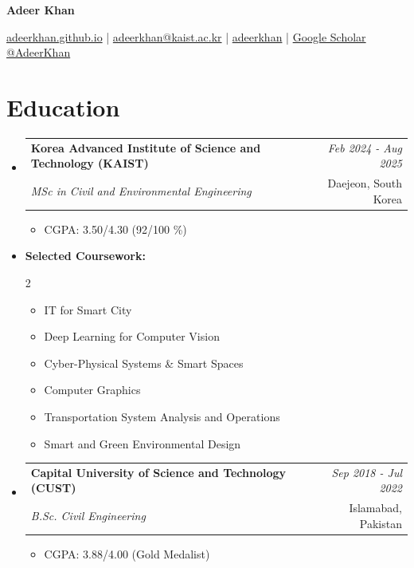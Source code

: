 \documentclass[a4paper,11pt]{article}
\makeatletter
\newcommand{\resumeSubheading}[4]{
\vspace{0.5mm}\item
    \begin{tabular*}{0.98\textwidth}[t]{l@{\extracolsep{\fill}}r}
        \textbf{#1} & \textit{\footnotesize{#4}} \\
        \textit{\footnotesize{#3}} &  \footnotesize{#2}\\
    \end{tabular*}
    \vspace{-2.4mm}
}
\newcommand{\resumeSubHeadingListStart}{\begin{itemize}[leftmargin=*,labelsep=1mm]}
\newcommand{\resumeItemListStart}{\begin{itemize}[leftmargin=*,labelsep=1mm,itemsep=0.5mm]}
\newcommand{\resumeSubHeadingListEnd}{\end{itemize}\vspace{2mm}}
\newcommand{\resumeItemListEnd}{\end{itemize}\vspace{-2mm}}
\newcommand{\socialicon}[1]{\raisebox{-0.05em}{\resizebox{!}{1em}{#1}}}
\newcommand{\headerfontiii}{\fontfamily{ppl}\selectfont} %
\makeatother
\begin{document}
\headerfontiii

\begin{center}
    {\Huge\textbf{Adeer Khan}}
\end{center}
\vspace{-6mm}

\begin{center}
    \small{
    \socialicon{\faGithub} \href{https://adeerkhan.github.io/}{adeerkhan.github.io} | 
    \socialicon{\faEnvelope} \href{mailto:adeerkhan@kaist.ac.kr}{adeerkhan@kaist.ac.kr} | 
    \socialicon{\faLinkedin} \href{https://www.linkedin.com/in/adeerkhan/}{adeerkhan} | 
    \socialicon{\faGoogle} \href{https://scholar.google.com/citations?user=your-id}{Google Scholar}
    }
    \socialicon{\faTwitter} \href{https://twitter.com/AdeerKhan}{@AdeerKhan}
\end{center}
\vspace{-3mm}

\section{\textbf{Education}}
\vspace{-0.4mm}
\resumeSubHeadingListStart

\resumeSubheading
{Korea Advanced Institute of Science and Technology (KAIST)}{Daejeon, South Korea}
{MSc in Civil and Environmental Engineering}{Feb 2024 - Aug 2025}
\resumeItemListStart
\item CGPA: 3.50/4.30 (92/100 \%)
\resumeItemListEnd
\item \textbf{Selected Coursework:}
\begin{multicols}{2}
\begin{itemize}[leftmargin=*,labelsep=1mm,itemsep=0.2mm,topsep=0mm,parsep=0mm,partopsep=0mm]
  \item IT for Smart City
  \item Deep Learning for Computer Vision
  \item Cyber-Physical Systems \& Smart Spaces
  \item Computer Graphics
  \item Transportation System Analysis and Operations
  \item Smart and Green Environmental Design
\end{itemize}
\end{multicols}


\resumeSubheading
{Capital University of Science and Technology (CUST)}{Islamabad, Pakistan}
{B.Sc. Civil Engineering}{Sep 2018 - Jul 2022}
\resumeItemListStart
\item CGPA: 3.88/4.00 (Gold Medalist)
\resumeItemListEnd
\resumeSubHeadingListEnd
\vspace{-6mm}
\end{document}
